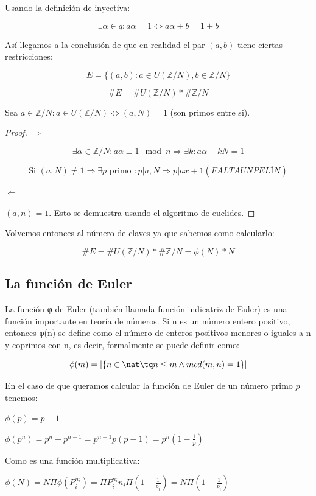 			Usando la definición de inyectiva:

				$$ \exists \alpha \in q : a \alpha = 1 \Leftrightarrow a \alpha + b = 1 + b $$

			Así llegamos a la conclusión de que en realidad el par $(a,b)$ tiene ciertas restricciones:

			$$ E = \{ (a,b): a \in U(\mathbb{Z}/N), b \in \mathbb{Z}/N \} $$

			$$ \#E = \#U(\mathbb{Z}/N) * \#\mathbb{Z}/N $$


			\begin{prop}
				Sea $a \in \mathbb{Z}/N : a \in U(\mathbb{Z}/N) \Leftrightarrow (a,N) = 1$ (son primos entre si).

				\begin{proof}

					\textbf{$\Rightarrow$}

					$$\exists \alpha \in \mathbb{Z}/N : a \alpha \equiv 1 \mod n \Rightarrow \exists k : a\alpha + kN = 1$$

					$$\text{Si } (a,N) \neq 1 \Rightarrow \exists p \text{ primo } : p | a, N \Rightarrow p | ax + 1 (FALTA UN PELÍN)$$

					\textbf{$\Leftarrow$}

					$(a,n) = 1$. Esto se demuestra usando el algoritmo de euclides.

				\end{proof}
			\end{prop}


			Volvemos entonces al número de claves ya que sabemos como calcularlo:

			$$ \#E = \#U(\mathbb{Z}/N) * \#\mathbb{Z}/N = \phi(N)*N $$


			\subsection{La función de Euler}

				\begin{defn}
				La función φ de Euler (también llamada función indicatriz de Euler) es una función importante en teoría de números. Si n es un número entero positivo, entonces φ(n) se define como el número de enteros positivos menores o iguales a n y coprimos con n, es decir, formalmente se puede definir como:

				\[\phi(m) = \left| \{n \in \nat \tq n \leq m \wedge mcd(m,n)=1\}\right|\]

				En el caso de que queramos calcular la función de Euler de un número primo $p$ tenemos:

				$\phi(p) = p-1$

				$\phi(p^n) = p^{n} - p^{n-1} = p^{n-1} p(p-1) = p^{n}(1- \frac{1}{p})$

				Como es una función multiplicativa:

				$\phi(N) =N \Pi \phi(P_i^{n_i}) = \Pi P_i^{n_i} n_i \Pi (1- \frac{1}{p_i}) = N \Pi(1 - \frac{1}{p_i})$

				\end{defn}

